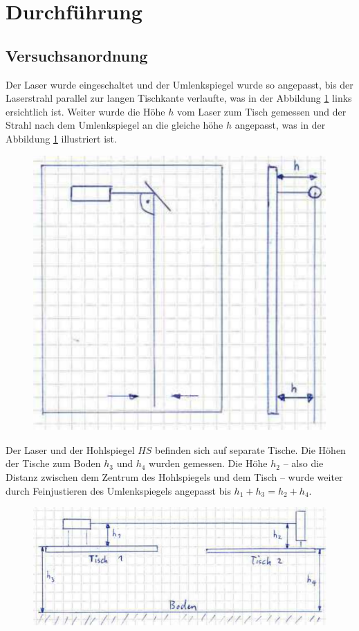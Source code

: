 \section{Durchf\"uhrung}

\subsection{Versuchsanordnung}

Der Laser  wurde eingeschaltet und  der Umlenkspiegel wurde so  angepasst, bis
der Laserstrahl parallel zur langen Tischkante verlaufte, was in der Abbildung
\ref{fig:laser-angle} links  ersichtlich ist. Weiter wurde die  H\"ohe $h$ vom
Laser zum Tisch gemessen und der  Strahl nach dem Umlenkspiegel an die gleiche
h\"ohe $h$  angepasst, was in der  Abbildung \ref{fig:laser-angle} illustriert
ist.

\begin{figure}[H]
    \center
    \includegraphics[width=.5\textwidth]{images/laser-angle.pdf}
    \caption{}
    \label{fig:laser-angle}
\end{figure}

Der  Laser und  der Hohlspiegel  $HS$  befinden sich  auf separate  Tische. Die
H\"ohen der Tische zum Boden $h_3$ und $h_4$ wurden gemessen. Die H\"ohe $h_2$
-- also  die Distanz  zwischen dem  Zentrum des Hohlspiegels  und dem  Tisch --
wurde weiter durch  Feinjustieren des Umlenkspiegels angepasst  bis $h_1+h_3 =
h_2+h_4$.

\begin{figure}[H]
    \center
    \includegraphics[width=.8\textwidth]{images/laser-height.pdf}
    \caption{}
    \label{fig:laser-height}
\end{figure}


